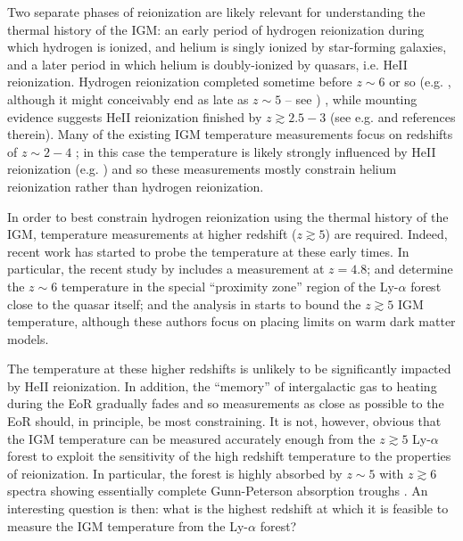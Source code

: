 Two separate phases of reionization are likely relevant for understanding the thermal history of the IGM: an early period
of hydrogen reionization during which hydrogen is ionized, and helium is singly ionized by star-forming galaxies, and a later period 
in which helium is doubly-ionized by quasars, i.e. HeII reionization. Hydrogen reionization completed sometime 
before $z \sim 6$ or so (e.g. \citealt{Fan:2005es}, although it might conceivably end
as late as $z \sim 5$ -- see \citealt{McGreer:2011dm,Mesinger:2009mv,Lidz:2007mz}) ,
while mounting evidence suggests HeII reionization finished by $z \gtrsim 2.5-3$ (see e.g. \citealt{Worseck:2011qk,Syphers:2011uw} and references therein). 
Many of the existing IGM temperature measurements focus on redshifts of
$z \sim 2-4$ \citep{Schaye:1999vr,Ricotti:1999hx,McDonald:2000nn,Zaldarriaga:2000mz,Theuns:2001my,Lidz:2009ca};
in this case the temperature is likely strongly influenced by HeII
reionization (e.g. \citealt{McQuinn:2008am,Compostella:2013zya}) and so these measurements
mostly constrain helium reionization rather than hydrogen reionization.

In order to best constrain hydrogen reionization using the
thermal history of the IGM, temperature measurements
at higher redshift ($z \gtrsim 5$) are required. Indeed, recent work
has started to probe the temperature at these early times. In particular,
the recent study by \citet{Becker:2012aq} includes a measurement
at $z=4.8$; \citet{Bolton:2011ck} and \citet{Raskutti:2012qz} determine
the $z \sim 6$ temperature in the special ``proximity zone'' region of the Ly-$\alpha$
forest close to the quasar itself; and the analysis in \citet{Viel:2013fqw} starts to bound
the $z \gtrsim 5$ IGM temperature, although these authors focus on placing
limits on warm dark matter models.

The temperature at these higher redshifts is unlikely to be significantly impacted by HeII reionization. 
In addition, the ``memory'' of intergalactic gas to heating during the EoR gradually fades and so measurements as close as possible
to the EoR should, in principle, be most constraining.
It is not, however, obvious that the IGM temperature can be measured accurately enough 
from the $z \gtrsim 5$ Ly-$\alpha$ forest to exploit the sensitivity of the high redshift temperature to the properties of reionization. In particular, the forest is highly absorbed by $z \sim 5$ with $z \gtrsim 6$ spectra showing
essentially complete Gunn-Peterson \citep{1965ApJ...142.1633G} absorption troughs \citep{Becker:2001ee,Fan:2005es}. An interesting question is then: what is the highest redshift at which it is feasible
to measure the IGM temperature from the Ly-$\alpha$ forest?

